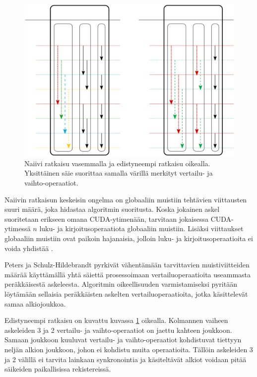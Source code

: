 \documentclass[a4paper,11pt]{article}
\begin{document}
\begin{figure}
\centering
\includegraphics[scale = 0.8]{bitonic_divided}
\caption{Naiivi ratkaisu vasemmalla ja edistyneempi ratkaisu oikealla. Yksittäinen säie suorittaa samalla värillä merkityt vertailu- ja vaihto-operaatiot.}
\label{fig:bitonic_divided}
\end{figure}

Naiivin ratkaisun keskeisin ongelma on globaaliin muistiin tehtävien viittausten suuri määrä, joka hidastaa algoritmin suoritusta. Koska jokainen askel suoritetaan erikseen omana CUDA-ytimenään, tarvitaan jokaisessa CUDA-ytimessä $n$ luku- ja kirjoitusoperaatiota globaaliin muistiin. Lisäksi viittaukset globaaliin muistiin ovat paikoin hajanaisia, jolloin luku- ja kirjoitusoperaatioita ei voida yhdistää \cite{peters2012gems}.

Peters ja Schulz-Hildebrandt \cite{peters2012gems} pyrkivät vähentämään tarvittavien muistiviitteiden määrää käyttämällä yhtä säiettä prosessoimaan vertailuoperaatioita useammasta peräkkäisestä askeleesta. Algoritmin oikeellisuuden varmistamiseksi pyritään löytämään sellaisia peräkkäisten askelten vertailuoperaatioita, jotka käsittelevät samaa alkiojoukkoa.

Edistyneempi ratkaisu on kuvattu kuvassa \ref{fig:bitonic_divided} oikealla. Kolmannen vaiheen askeleiden 3 ja 2 vertailu- ja vaihto-operaatiot on jaettu kahteen joukkoon. Samaan joukkoon kuuluvat vertailu- ja vaihto-operaatiot kohdistuvat tiettyyn neljän alkion joukkoon, johon ei kohdistu muita operaatioita. Tällöin askeleiden 3 ja 2 välillä ei tarvita lainkaan synkronointia ja käsiteltävät alkiot voidaan pitää säikeiden paikallisissa rekistereissä.
\end{document}

